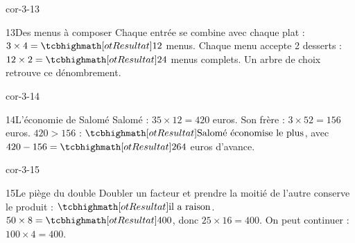 \begin{blocLivre}{cor-3-13}\begin{corrige}{13}{Des menus à composer}
Chaque entrée se combine avec chaque plat : $3\times4=\res{12}$ menus. Chaque menu accepte 2 desserts : $12\times2=\res{24}$ menus complets. Un arbre de choix retrouve ce dénombrement.
\end{corrige}\end{blocLivre}
\begin{blocLivre}{cor-3-14}\begin{corrige}{14}{L’économie de Salomé}
Salomé : $35\times12=420$ euros. Son frère : $3\times52=156$ euros. $420>156$ : $\res{\text{Salomé économise le plus}}$, avec $420-156=\res{264}$ euros d’avance.
\end{corrige}\end{blocLivre}
\begin{blocLivre}{cor-3-15}\begin{corrige}{15}{Le piège du double}
Doubler un facteur et prendre la moitié de l’autre conserve le produit : $\res{\text{il a raison}}$. $50\times8=\res{400}$, donc $25\times16=400$. On peut continuer : $100\times4=400$.
\end{corrige}\end{blocLivre}
